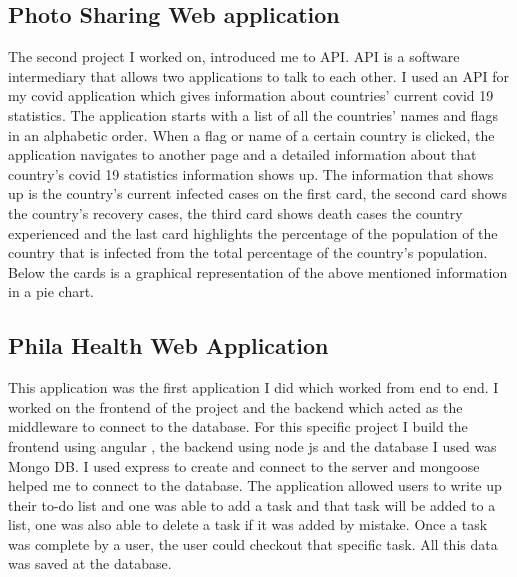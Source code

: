 \documentclass[paper=a4, fontsize=12pt]{scrartcl}
\numberwithin{equation}{section}		%
\numberwithin{figure}{section}			%
\numberwithin{table}{section}				%
\begin{document}
\subsection{Photo Sharing Web application}
The second project I worked on, introduced me to API. API is a software intermediary that allows two applications to talk to each other. I used an API for my covid application which gives information about countries’ current covid 19 statistics. The application starts with a list of all the countries’ names and flags in an alphabetic order. 
When a flag or name of a certain country is clicked, the application navigates to another page and a detailed information about that country’s covid 19 statistics information shows up. The information that shows up is the country’s current infected cases on the first card, the second card shows the country’s recovery cases, the third card shows death cases the country experienced and the last card highlights the percentage of the population of the country that is infected from the total percentage of the country’s population. Below the cards is a graphical representation of the above mentioned information in a pie chart.

\subsection{Phila Health Web Application}
This application was the first application I did which worked from end to end. I worked on the frontend of the project and the backend which acted as the middleware to connect to the database. For this specific project I build the frontend using angular , the backend using node js and the database I used was Mongo DB. I used express to create and connect to the server and mongoose helped me to connect to the database. 
The application allowed users to write up their to-do list and one was able to add a task and that task will be added to a list, one was also able to delete a task if it was added by mistake. Once a task was complete by a user, the user could checkout that specific  task. All this data was saved at the database.


\end{document}
